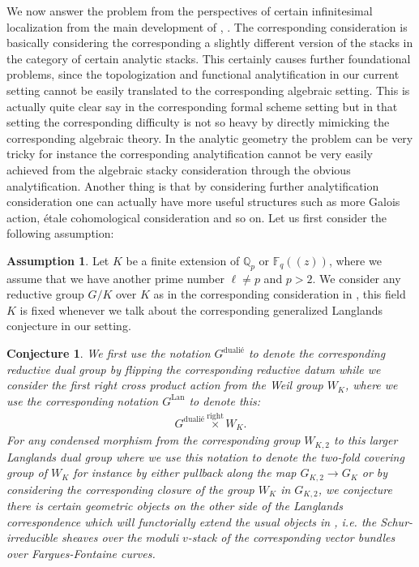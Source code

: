 \documentclass[12pt]{book}
\newtheorem{conjecture}{Conjecture}
\theoremstyle{definition}
\newtheorem{assumption}{Assumption}
\begin{document}
\noindent We now answer the problem from the perspectives of certain infinitesimal localization from the main development of \cite{VLa}, \cite{FS}. The corresponding consideration is basically considering the corresponding a slightly different version of the stacks in the category of certain analytic stacks. This certainly causes further foundational problems, since the topologization and functional analytification in our current setting cannot be easily translated to the corresponding algebraic setting. This is actually quite clear say in the corresponding formal scheme setting but in that setting the corresponding difficulty is not so heavy by directly mimicking the corresponding algebraic theory. In the analytic geometry the problem can be very tricky for instance the corresponding analytification cannot be very easily achieved from the algebraic stacky consideration through the obvious analytification. Another thing is that by considering further analytification consideration one can actually have more useful structures such as more Galois action, \'etale cohomological consideration and so on. Let us first consider the following assumption:

\begin{assumption}
Let $K$ be a finite extension of $\mathbb{Q}_p$ or $\mathbb{F}_q((z))$, where we assume that we have another prime number $\ell \neq p$ and $p>2$. We consider any reductive group $G/K$ over $K$ as in the corresponding consideration in \cite{FS}, this field $K$ is fixed whenever we talk about the corresponding generalized Langlands conjecture in our setting.
\end{assumption} 


\begin{conjecture}
We first use the notation $G^\text{duali\'e}$ to denote the corresponding reductive dual group by flipping the corresponding reductive datum while we consider the first right cross product action from the Weil group $W_K$, where we use the corresponding notation $G^\text{Lan}$ to denote this:
\begin{align}
G^\text{duali\'e} \overset{\mathrm{right}}{\times} W_K.
\end{align}
For any condensed morphism from the corresponding group $W_{K,2}$ to this larger Langlands dual group where we use this notation to denote the two-fold covering group of $W_{K}$ for instance by either pullback along the map $G_{K,2}\rightarrow G_K$ or by considering the corresponding closure of the group $W_K$ in $G_{K,2}$, we conjecture there is certain geometric objects on the other side of the Langlands correspondence which will functorially extend the usual objects in \cite{FS}, i.e. the Schur-irreducible sheaves over the moduli $v$-stack of the corresponding vector bundles over Fargues-Fontaine curves.
\end{conjecture}
\end{document}
